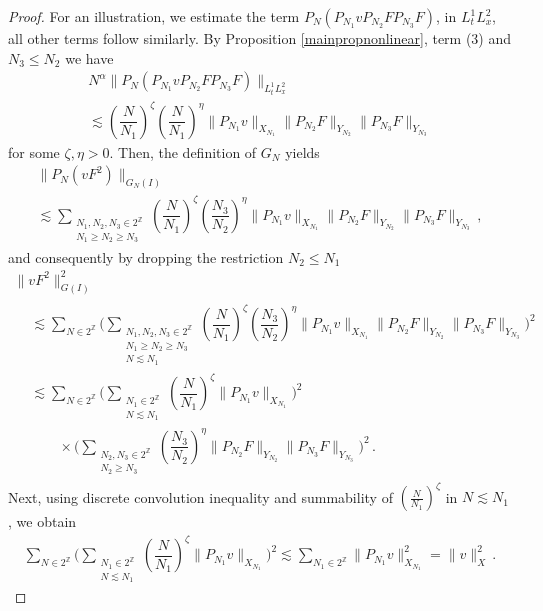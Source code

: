 \documentclass[10pt,leqno]{amsart}
\numberwithin{equation}{section}
\newcommand{\N}{\mathbb{N}}
\newcommand{\Z}{\mathbb{Z}}
\begin{document}
\begin{proof}
For an illustration, we estimate the term $P_N(P_{N_1} v P_{N_2} F P_{N_3} F)$, in $L^1_tL^2_x$, all other terms follow similarly. By Proposition \ref{mainpropnonlinear}, term (3) 
and $N_3 \leq N_2$ we have
\begin{multline*}
N^\alpha \|P_N (P_{N_1} v P_{N_2} F P_{N_3}F)\|_{L^1_t L_x^2} \\
\lesssim \left(\dfrac{N}{N_1}\right)^{\zeta}   \left(\dfrac{N}{N_1}\right)^{\eta}  \|P_{N_1}v\|_{X_{N_1}}\|P_{N_2}F\|_{Y_{N_2}} \|P_{N_3}F\|_{Y_{N_3}}
\end{multline*} 
for some $\zeta, \eta > 0$. 
Then,  the definition of $G_N$ yields
\begin{multline*}
\|P_N(vF^2)\|_{G_N(I)}  \\
\lesssim  \sum_{\substack{N_1, N_2, N_3 \in 2^\Z\\ N_1 \geq N_2 \geq N_3}}  \left(\dfrac{N}{N_1}\right)^{\zeta} \left(\dfrac{N_3}{N_2}\right)^{\eta} \|P_{N_1}v\|_{X_{N_1}}\|P_{N_2}F\|_{Y_{N_2}} \|P_{N_3}F\|_{Y_{N_3}}\,,
\end{multline*}
and consequently by dropping the restriction $N_2 \leq N_1$
\begin{multline*}
\|vF^2\|_{G(I)}^2 \\
\begin{aligned}
 &\lesssim \sum_{N \in 2^\Z}  \Bigg(\sum_{\substack{N_1, N_2, N_3 \in 2^\Z\\ N_1 \geq N_2 \geq N_3\\ N \lesssim N_1}} 
 \left(\dfrac{N}{N_1}\right)^{\zeta}  \left(\dfrac{N_3}{N_2}\right)^{\eta}  \|P_{N_1}v\|_{X_{N_1}}\|P_{N_2}F\|_{Y_{N_2}} \|P_{N_3}F\|_{Y_{N_3}} \Bigg)^2 \\
 &\lesssim \sum_{N \in 2^\Z}  \Bigg(\sum_{\substack{N_1 \in 2^\Z \\N \lesssim N_1}} \left(\dfrac{N}{N_1}\right)^{\zeta}  \|P_{N_1}v\|_{X_{N_1}}\Bigg)^2 \\
 & \qquad  \times
\Bigg( \sum_{\substack{N_2, N_3 \in 2^\Z \\ N_2 \geq  N_3}} \left(\dfrac{N_3}{N_2}\right)^{\eta}  \|P_{N_2}F\|_{Y_{N_2}} \|P_{N_3}F\|_{Y_{N_3}} \Bigg)^2 \,.
\end{aligned}
\end{multline*}
Next, using discrete convolution inequality and summability of $\left(\frac{N}{N_1}\right)^{\zeta}$ in $N \lesssim N_1$, we obtain
\begin{align*}
 \sum_{N \in 2^\Z}  \Bigg(\sum_{\substack{N_1 \in 2^\Z \\ N \lesssim N_1}} \left(\dfrac{N}{N_1}\right)^{\zeta}  \|P_{N_1}v\|_{X_{N_1}}\Bigg)^2  \lesssim  \sum_{N_1 \in 2^\Z} \|P_{N_1}v\|_{X_{N_1}}^2 = \|v\|_{X}^2 \,.

\end{align*}
\end{proof}
\end{document}
